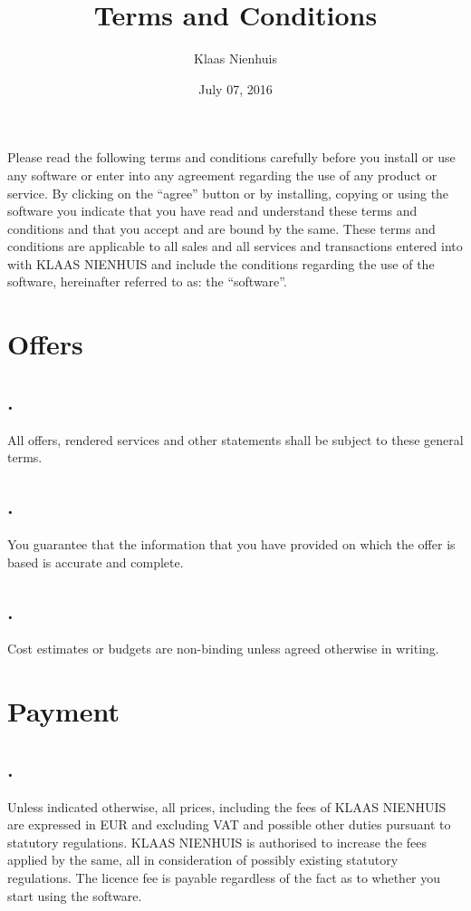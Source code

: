 \documentclass[letterpaper,10pt,english]{sphinxmanual}
\title{Terms and Conditions}
\date{July 07, 2016}
\author{Klaas Nienhuis}
\begin{document}
\maketitle
\tableofcontents
{}\label{index::doc}


Please read the following terms and conditions carefully before you install or use any software or enter into any agreement regarding the use of any product or service. By clicking on the “agree” button or by installing, copying or using the software you indicate that you have read and understand these terms and conditions and that you accept and are bound by the same. These terms and conditions are applicable to all sales and all services and transactions entered into with KLAAS NIENHUIS and include the conditions regarding the use of the software, hereinafter referred to as: the “software”.


\chapter{Offers}
\label{Offers::doc}\label{Offers:offers}\label{Offers:terms-and-conditions}

\section{.}
\label{Offers:id1}
All offers, rendered services and other statements shall be subject to these general terms.


\section{.}
\label{Offers:id2}
You guarantee that the information that you have provided on which the offer is based is accurate and complete.


\section{.}
\label{Offers:id3}
Cost estimates or budgets are non-binding unless agreed otherwise in writing.


\chapter{Payment}
\label{Payment::doc}\label{Payment:payment}

\section{.}
\label{Payment:id1}
Unless indicated otherwise, all prices, including the fees of KLAAS NIENHUIS are expressed in EUR and excluding VAT and possible other duties pursuant to statutory regulations. KLAAS NIENHUIS is authorised to increase the fees applied by the same, all in consideration of possibly existing statutory regulations. The licence fee is payable regardless of the fact as to whether you start using the software.
\end{document}

